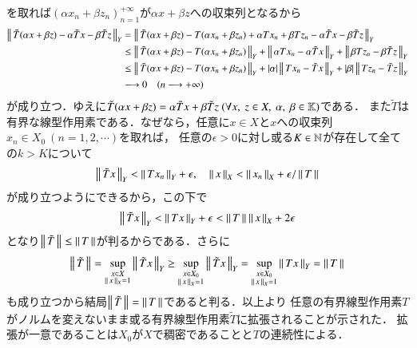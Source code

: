 \begin{prf}
		を取れば$(\alpha x_n + \beta z_n)_{n=1}^{+\infty}$が$\alpha x+ \beta z$への収束列となるから
		\begin{align}
			\left\|\, \tilde{T}(\alpha x + \beta z) - \alpha \tilde{T}x - \beta \tilde{T}z\, \right\|_{Y}
			&= \left\|\, \tilde{T}(\alpha x + \beta z) - T(\alpha x_n + \beta z_n) + \alpha Tx_n + \beta Tz_n - \alpha \tilde{T}x - \beta \tilde{T}z\, \right\|_{Y} \\
			&\leq \left\|\, \tilde{T}(\alpha x + \beta z) - T(\alpha x_n + \beta z_n)\, \right\|_{Y}
				+ \left\|\, \alpha Tx_n - \alpha \tilde{T}x\, \right\|_{Y} + \left\|\, \beta Tz_n - \beta \tilde{T}z\, \right\|_{Y} \\
			&\leq \left\|\, \tilde{T}(\alpha x + \beta z) - T(\alpha x_n + \beta z_n)\, \right\|_{Y}
				+ |\alpha| \left\|\, Tx_n - \tilde{T}x\, \right\|_{Y} + |\beta| \left\|\, Tz_n - \tilde{T}z\, \right\|_{Y} \\
			&\longrightarrow 0\quad (n \longrightarrow +\infty)
		\end{align}
		が成り立つ．ゆえに$\tilde{T}(\alpha x + \beta z) = \alpha \tilde{T}x + \beta \tilde{T}z\ (\forall x,\ z \in X,\ \alpha,\ \beta \in \mathbb{K})$である．
		また$\tilde{T}$は有界な線型作用素である．なぜなら，任意に$x \in X$と$x$への収束列$x_n \in X_0\ (n = 1,2,\cdots)$を取れば，
		任意の$\epsilon > 0$に対し或る$K \in \mathbb{N}$が存在して全ての$k > K$について
		\begin{align}
			\left\|\, \tilde{T}x\, \right\|_{Y} < \left\|\, Tx_n\, \right\|_{Y} + \epsilon, \quad \left\|\, x\, \right\|_{X} < \left\|\, x_n\, \right\|_{X} + \epsilon/\left\|\, T\, \right\|_{}
		\end{align}
		が成り立つようにできるから，この下で
		\begin{align}
			\left\|\, \tilde{T}x\, \right\|_{Y} < \left\|\, Tx\, \right\|_{Y} + \epsilon < \left\|\, T\, \right\|_{} \left\|\, x\, \right\|_{X} + 2\epsilon
		\end{align}
		となり$\left\|\, \tilde{T}\, \right\|_{} \leq \left\|\, T\, \right\|_{}$が判るからである．さらに
		\begin{align}
			\left\|\, \tilde{T}\, \right\|_{} = \operatorname*{sup}_{\substack{x \in X \\ \left\|\, x\, \right\|_{X} = 1}} \left\|\, \tilde{T}x\, \right\|_{Y} 
			\geq \operatorname*{sup}_{\substack{x \in X_0 \\ \left\|\, x\, \right\|_{X} = 1}} \left\|\, \tilde{T}x\, \right\|_{Y} 
			= \operatorname*{sup}_{\substack{x \in X_0 \\ \left\|\, x\, \right\|_{X} = 1}} \left\|\, Tx\, \right\|_{Y} = \left\|\, T\, \right\|_{}
		\end{align}
		も成り立つから結局$\left\|\, \tilde{T}\, \right\|_{} = \left\|\, T\, \right\|_{}$であると判る．以上より
		任意の有界線型作用素$T$がノルムを変えないまま或る有界線型作用素$\tilde{T}$に拡張されることが示された．
		拡張が一意であることは$X_0$が$X$で稠密であることと$T$の連続性による．
		\QED
\end{prf}

